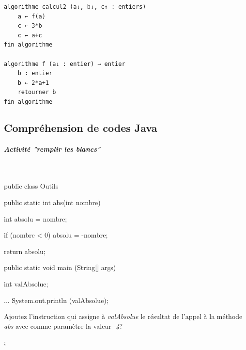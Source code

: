\documentclass[11pt,a4paper]{article}
\begin{document}
\begin{itemize}
\begin{verbatim}
algorithme calcul2 (a↓, b↓, c↑ : entiers)
    a ← f(a) 
    c ← 3*b 
    c ← a+c
fin algorithme

algorithme f (a↓ : entier) → entier
    b : entier
    b ← 2*a+1
    retourner b
fin algorithme
				            \end{verbatim} \textcolor{gray}{\underline{\hspace*{1em}}}  \textcolor{gray}{\underline{\hspace*{1em}}}  \textcolor{gray}{\underline{\hspace*{1em}}}  \textcolor{gray}{\underline{\hspace*{2em}}} 
					\end{itemize}
				
            \par
        \subsection{Compr\'ehension de codes Java}
			
		\subparagraph{Activit\'e "remplir les blancs"} 
		
                \textcolor{white}{.} \par
            \begin{Java}
public class Outils {

	public static int abs(int nombre) { 

		int absolu = nombre;

		if (nombre < 0) {		
			absolu = -nombre;
		} 
		
		return absolu;
		
	}
	
	public static void main (String[] args) {  
	
		int valAbsolue;  
		
		...  
		System.out.println (valAbsolue);  
		
	}

}				\end{Java}
                Ajoutez l'instruction qui assigne \`a \textit{valAbsolue} 
                le r\'esultat de l'appel \`a la m\'ethode \textit{abs} avec comme param\`etre la valeur 
                \textit{-4}?
              
            \par
         \textcolor{gray}{\underline{\hspace*{10em}}}  \textcolor{gray}{\underline{\hspace*{1em}}}  \textcolor{gray}{\underline{\hspace*{5em}}}  ;
            \clearpage
			
\end{document}
